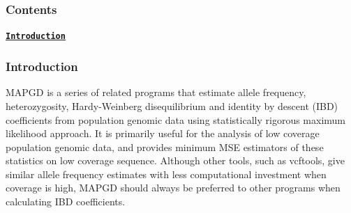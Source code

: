 \subsubsection*{Contents}

\paragraph*{\href{https://lynchlab.github.io/MAPGD/index.html#-introduction-}{\tt Introduction}}

\subsubsection*{Introduction }

M\-A\-P\-G\-D is a series of related programs that estimate allele frequency, heterozygosity, Hardy-\/\-Weinberg disequilibrium and identity by descent (I\-B\-D) coefficients from population genomic data using statistically rigorous maximum likelihood approach. It is primarily useful for the analysis of low coverage population genomic data, and provides minimum M\-S\-E estimators of these statistics on low coverage sequence. Although other tools, such as vcftools, give similar allele frequency estimates with less computational investment when coverage is high, M\-A\-P\-G\-D should always be preferred to other programs when calculating I\-B\-D coefficients. 